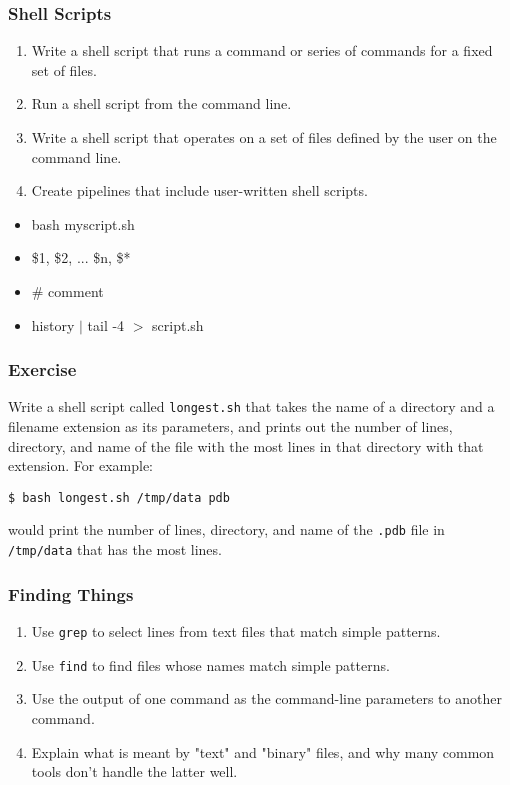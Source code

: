 \documentclass[xcolor=dvipsnames]{beamer}
\begin{document}
\begin{frame}
\frametitle{Shell Scripts}
\begin{enumerate}
\item Write a shell script that runs a command or series of commands for a fixed set of files.
\item Run a shell script from the command line.
\item Write a shell script that operates on a set of files defined by the user on the command line.
\item Create pipelines that include user-written shell scripts.
\end{enumerate}
\begin{multicols}{2}
\begin{itemize}
  \item bash myscript.sh
  \item \$1, \$2, ... \$n, \$*
  \item \# comment
  \item history $|$ tail -4 $>$ script.sh
\end{itemize}
\end{multicols}
\end{frame}


\begin{frame}[fragile]
\frametitle{Exercise}
Write a shell script called {\tt longest.sh} that takes the name of a directory and a filename extension as its parameters,
and prints out the number of lines,
directory,
and name of the file with the most lines in that directory with that extension.
For example:

\begin{verbatim}
$ bash longest.sh /tmp/data pdb
\end{verbatim}

would print the number of lines,
directory,
and name of the {\tt .pdb} file in {\tt /tmp/data} that has
the most lines.
\end{frame}


\begin{frame}
\frametitle{Finding Things}
\begin{enumerate}
  \item Use {\tt grep} to select lines from text files that match simple patterns.
  \item Use {\tt find} to find files whose names match simple patterns.
  \item Use the output of one command as the command-line parameters to another command.
  \item Explain what is meant by "text" and "binary" files, and why many common tools don't handle the latter well.
\end{enumerate}
\end{frame}
\end{document}
